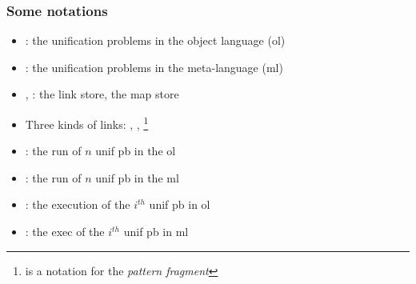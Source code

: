 \documentclass{pres}
\begin{document}
\begin{frame}
  \frametitle{Some notations}

  \begin{itemize}
    \item \foUnifPb: the unification problems in the object language (ol)
    \item \hoUnifPb: the unification problems in the meta-language (ml)
    \item \linkStore, \mapStore: the link store, the map store
    \item Three kinds of links: \maybebeta, \maybeeta, \maybelam\footnote{\llam is a notation for the \textit{pattern fragment}}
  \end{itemize}

  \mysep

  \begin{itemize}
    \item {}: the run of $n$ unif pb in the ol
    \item {}: the run of $n$ unif pb in the ml
    \item {}: the execution of the $i^{th}$ unif pb in ol
    \item {}: the exec of the $i^{th}$ unif pb in ml
  \end{itemize}


\end{frame}
\end{document}
